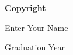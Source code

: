
\newpage

\thispagestyle{empty}

\vspace*{0.9cm}

\begin{center}

{\bf \Huge Copyright}

\vspace{1cm}


   \Large Enter Your Name\\

   \vspace{0.5cm}


   Graduation Year\\

   \vspace{0.5cm}

\end{center}
